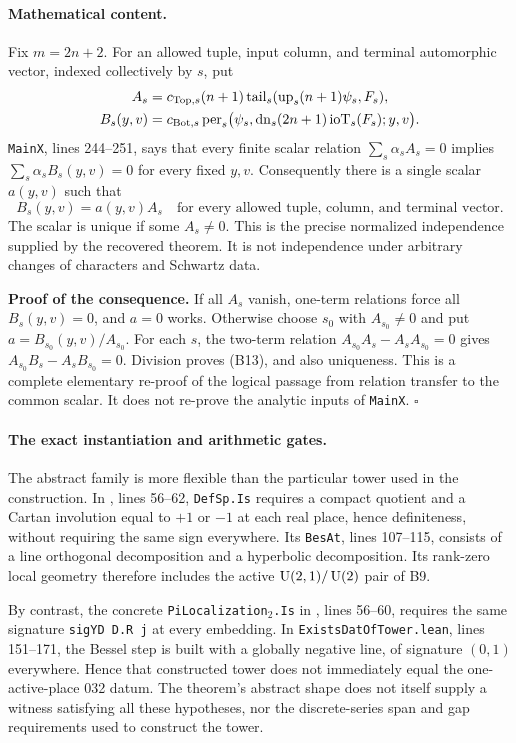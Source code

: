 \documentclass[11pt]{article}
\theoremstyle{definition}\newtheorem{definition}[theorem]{Definition}\newtheorem{remark}[theorem]{Remark}
\begin{document}
\paragraph{Mathematical content.}
Fix $m=2n+2$. For an allowed tuple, input column, and terminal automorphic vector, indexed collectively by $s$, put
\begin{align*}
 A_s&=c_{{\rm Top},s}(n+1)
      \operatorname{tail}_s(\operatorname{up}_s(n+1)\psi_s,F_s),\\
 B_s(y,v)&=c_{{\rm Bot},s}
      \operatorname{per}_s\bigl(\psi_s,
       \operatorname{dn}_s(2n+1)\operatorname{ioT}_s(F_s);y,v\bigr).
\end{align*}
\texttt{MainX}, lines 244--251, says that every finite scalar relation
$\sum_s\alpha_s A_s=0$ implies
$\sum_s\alpha_s B_s(y,v)=0$ for every fixed $y,v$.
Consequently there is a single scalar $a(y,v)$ such that
\[
 B_s(y,v)=a(y,v)A_s
 \quad\text{for every allowed tuple, column, and terminal vector.}
 \tag{B13}
\]
The scalar is unique if some $A_s\ne0$. This is the precise normalized independence supplied by the recovered theorem. It is not independence under arbitrary changes of characters and Schwartz data.

\textbf{Proof of the consequence.} If all $A_s$ vanish, one-term relations force all $B_s(y,v)=0$, and $a=0$ works. Otherwise choose $s_0$ with $A_{s_0}\ne0$ and put $a=B_{s_0}(y,v)/A_{s_0}$. For each $s$, the two-term relation
$A_{s_0}A_s-A_sA_{s_0}=0$ gives
$A_{s_0}B_s-A_sB_{s_0}=0$. Division proves (B13), and also uniqueness. This is a complete elementary re-proof of the logical passage from relation transfer to the common scalar. It does not re-prove the analytic inputs of \texttt{MainX}. \hfill$\square$

\paragraph{The exact instantiation and arithmetic gates.}
The abstract family is more flexible than the particular tower used in the construction. In , lines 56--62, \texttt{DefSp.Is} requires a compact quotient and a Cartan involution equal to $+1$ or $-1$ at each real place, hence definiteness, without requiring the same sign everywhere. Its \texttt{BesAt}, lines 107--115, consists of a line orthogonal decomposition and a hyperbolic decomposition. Its rank-zero local geometry therefore includes the active $\operatorname{U}(2,1)/\operatorname{U}(2)$ pair of B9.

By contrast, the concrete \texttt{PiLocalization$_2$.Is} in
, lines 56--60, requires the same signature \texttt{sigYD D.R j} at every embedding. In \texttt{ExistsDatOfTower.lean}, lines 151--171, the Bessel step is built with a globally negative line, of signature $(0,1)$ everywhere. Hence that constructed tower does not immediately equal the one-active-place 032 datum. The theorem's abstract shape does not itself supply a witness satisfying all these hypotheses, nor the discrete-series span and gap requirements used to construct the tower.
\end{document}
